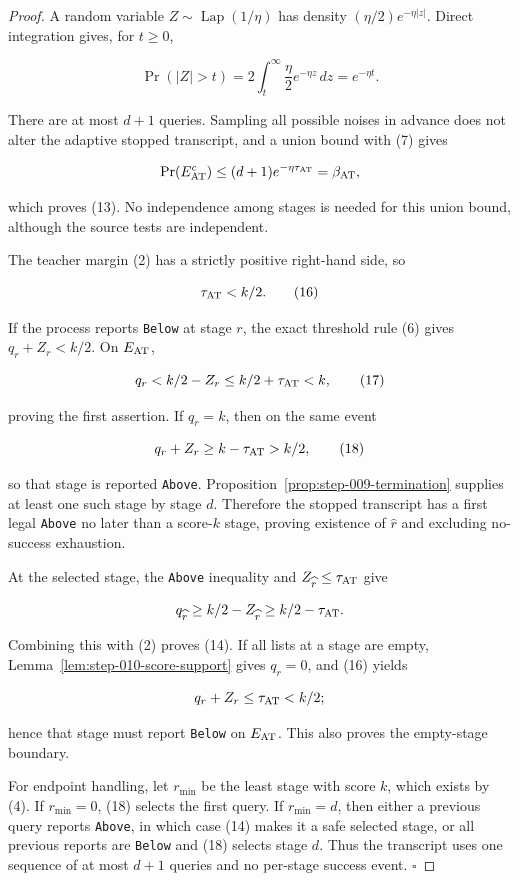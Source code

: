 \begin{proof}
A random variable
\(Z\sim\operatorname{Lap}(1/\eta)\) has density
\((\eta/2)e^{-\eta|z|}\). Direct integration gives, for \(t\geq0\),

\[
 \Pr(|Z|>t)
 =2\int_t^\infty\frac{\eta}{2}e^{-\eta z}\,dz
 =e^{-\eta t}.
 \tag{15}
\]

There are at most \(d+1\) queries. Sampling all possible noises in advance
does not alter the adaptive stopped transcript, and a union bound with (7)
gives

\[
 \Pr(E_{\rm AT}^c)
 \leq(d+1)e^{-\eta\tau_{\rm AT}}
 =\beta_{\rm AT},
\]

which proves (13). No independence among stages is needed for this union
bound, although the source tests are independent.

The teacher margin (2) has a strictly positive right-hand side, so

\[
 \tau_{\rm AT}<k/2.
 \tag{16}
\]

If the process reports \texttt{Below} at stage \(r\), the exact threshold rule (6)
gives \(q_r+Z_r<k/2\). On \(E_{\rm AT}\),

\[
 q_r<k/2-Z_r\leq k/2+\tau_{\rm AT}<k,
 \tag{17}
\]

proving the first assertion. If \(q_r=k\), then on the same event

\[
 q_r+Z_r\geq k-\tau_{\rm AT}>k/2,
 \tag{18}
\]

so that stage is reported \texttt{Above}. Proposition~\ref{prop:step-009-termination} supplies at least one such stage
by stage \(d\). Therefore the stopped transcript has a first legal \texttt{Above}
no later than a score-\(k\) stage, proving existence of \(\widehat r\) and
excluding no-success exhaustion.

At the selected stage, the \texttt{Above} inequality and
\(Z_{\widehat r}\leq\tau_{\rm AT}\) give

\[
 q_{\widehat r}
 \geq k/2-Z_{\widehat r}
 \geq k/2-\tau_{\rm AT}.
\]

Combining this with (2) proves (14). If all lists at a stage are empty,
Lemma~\ref{lem:step-010-score-support} gives \(q_r=0\), and (16) yields

\[
 q_r+Z_r\leq\tau_{\rm AT}<k/2;
\]

hence that stage must report \texttt{Below} on \(E_{\rm AT}\). This also proves
the empty-stage boundary.

For endpoint handling, let \(r_{\min}\) be the least stage with score
\(k\), which exists by (4). If \(r_{\min}=0\), (18) selects the first query.
If \(r_{\min}=d\), then either a previous query reports \texttt{Above}, in which
case (14) makes it a safe selected stage, or all previous reports are
\texttt{Below} and (18) selects stage \(d\). Thus the transcript uses one sequence
of at most \(d+1\) queries and no per-stage success event. \(\square\)


\end{proof}

